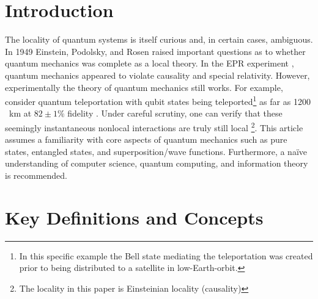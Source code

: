 \documentclass[%
 aip,
cp,  %
 amsmath,amssymb,%
 reprint,%
]{revtex4-2}
\begin{document}
\section{Introduction}
    The locality of quantum systems is itself curious and, in certain cases, ambiguous. In 1949 Einstein, Podolsky, and Rosen raised important questions as to whether quantum mechanics was complete as a local theory. In the EPR experiment \cite{epr}, quantum mechanics appeared to violate causality and special relativity. However, experimentally the theory of quantum mechanics still works. For example, consider quantum teleportation \cite{teleport} with qubit states being teleported\footnote{In this specific example the Bell state mediating the teleportation was created prior to being distributed to a satellite in low-Earth-orbit.} as far as 1200 \ km at $82\pm 1 \%$ fidelity \cite{long_range_teleport}. Under careful scrutiny, one can verify that these seemingly instantaneous nonlocal interactions are truly still local \footnote{The locality in this paper is Einsteinian locality (causality)}.
    This article assumes a familiarity with core aspects of quantum mechanics such as pure states, entangled states, and superposition/wave functions. Furthermore, a na{\"i}ve understanding of computer science, quantum computing, and information theory is recommended.
\section{Key Definitions and Concepts}
\end{document}
